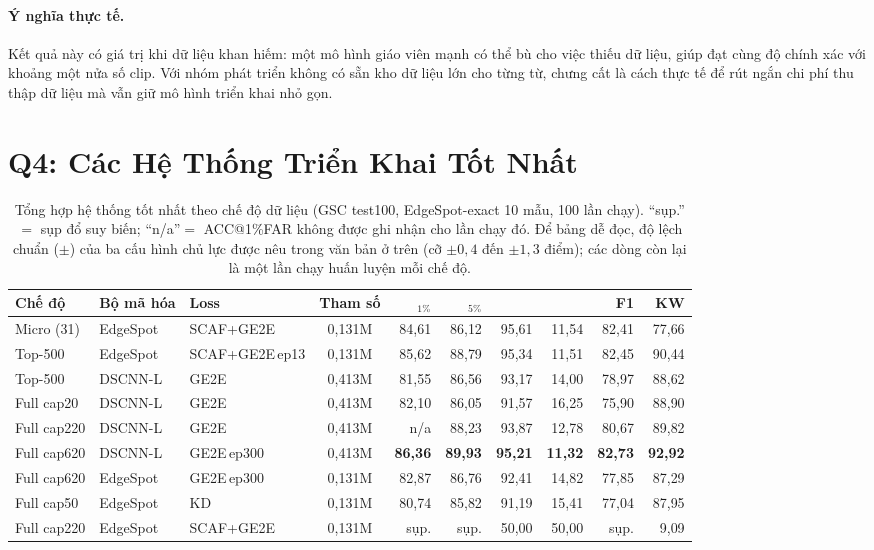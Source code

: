 \documentclass[12pt,a4paper]{report}
\newcommand{\acc}{\text{ACC}}
\newcommand{\eer}{\text{EER}}
\newcommand{\auc}{\text{AUC}}
\newcommand{\best}[1]{\textbf{#1}}
\begin{document}
\paragraph{Ý nghĩa thực tế.} Kết quả này có giá trị khi dữ liệu khan hiếm: một
mô hình giáo viên mạnh có thể bù cho việc thiếu dữ liệu, giúp đạt cùng độ chính xác
với khoảng một nửa số clip. Với nhóm phát triển không có sẵn kho dữ liệu lớn cho
từng từ, chưng cất là cách thực tế để rút ngắn chi phí thu thập dữ liệu mà vẫn giữ
mô hình triển khai nhỏ gọn.

\section{Q4: Các Hệ Thống Triển Khai Tốt Nhất}\label{sec:res-q4}

\begin{table}[H]
\centering
\caption{Tổng hợp hệ thống tốt nhất theo chế độ dữ liệu (GSC test100,
EdgeSpot-exact 10 mẫu, 100 lần chạy). ``sụp.''$=$ sụp đổ suy biến; ``n/a''$=$
ACC@1\%FAR không được ghi nhận cho lần chạy đó. Để bảng dễ đọc, độ lệch chuẩn
($\pm$) của ba cấu hình chủ lực được nêu trong văn bản ở trên (cỡ $\pm0{,}4$ đến
$\pm1{,}3$ điểm); các dòng còn lại là một lần chạy huấn luyện mỗi chế độ.}
\label{tab:final}
\scriptsize
\setlength{\tabcolsep}{3pt}
\begin{tabular}{l l l c r r r r r r}
\toprule
\textbf{Chế độ} & \textbf{Bộ mã hóa} & \textbf{Loss} & \textbf{Tham số} &
\acc$_{1\%}$ & \acc$_{5\%}$ & \auc & \eer & F1 & KW\\
\midrule
Micro (31)    & EdgeSpot & SCAF+GE2E      & 0{,}131M & 84{,}61 & 86{,}12 & 95{,}61 & 11{,}54 & 82{,}41 & 77{,}66 \\
Top-500       & EdgeSpot & SCAF+GE2E\,ep13& 0{,}131M & 85{,}62 & 88{,}79 & 95{,}34 & 11{,}51 & 82{,}45 & 90{,}44 \\
Top-500       & DSCNN-L  & GE2E           & 0{,}413M & 81{,}55 & 86{,}56 & 93{,}17 & 14{,}00 & 78{,}97 & 88{,}62 \\
Full cap20    & DSCNN-L  & GE2E           & 0{,}413M & 82{,}10 & 86{,}05 & 91{,}57 & 16{,}25 & 75{,}90 & 88{,}90 \\
Full cap220   & DSCNN-L  & GE2E           & 0{,}413M & n/a & 88{,}23 & 93{,}87 & 12{,}78 & 80{,}67 & 89{,}82 \\
\rowcolor{blue!7}
Full cap620   & DSCNN-L  & GE2E\,ep300    & 0{,}413M & \best{86{,}36} & \best{89{,}93} & \best{95{,}21} & \best{11{,}32} & \best{82{,}73} & \best{92{,}92} \\
Full cap620   & EdgeSpot & GE2E\,ep300    & 0{,}131M & 82{,}87 & 86{,}76 & 92{,}41 & 14{,}82 & 77{,}85 & 87{,}29 \\
Full cap50    & EdgeSpot & KD             & 0{,}131M & 80{,}74 & 85{,}82 & 91{,}19 & 15{,}41 & 77{,}04 & 87{,}95 \\
Full cap220   & EdgeSpot & SCAF+GE2E      & 0{,}131M & sụp. & sụp. & 50{,}00 & 50{,}00 & sụp. & 9{,}09 \\
\bottomrule
\end{tabular}
\end{table}
\end{document}
